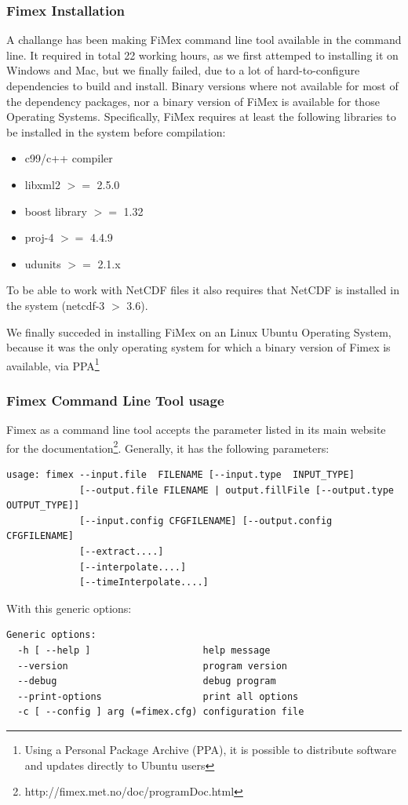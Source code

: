 \documentclass[11pt,a4paper,titlepage,oneside]{report}
\begin{document}
\subsubsection{\gls{Fimex} Installation}
\label{sec:ChallangeFimexInstallation}
A challange has been making FiMex command line tool available in the command line. It required in total 22 working hours, as we first attemped to installing it on Windows and Mac, but we finally failed, due to a lot of hard-to-configure dependencies to build and install. Binary versions where not available for most of the dependency packages, nor a binary version of FiMex is available for those Operating Systems.
Specifically, FiMex requires at least the following libraries to be installed in the system before compilation:
\begin{itemize}
\item c99/c++ compiler
\item libxml2 $>=$ 2.5.0
\item boost library $>=$ 1.32
\item proj-4 $>=$ 4.4.9
\item udunits $>=$ 2.1.x
\end{itemize}

To be able to work with NetCDF files it also requires that NetCDF is installed in the system (netcdf-3 $>$ 3.6).

We finally succeded in installing FiMex on an Linux Ubuntu Operating System, because it was the only operating system for which a binary version of \gls{Fimex} is available, via \gls{PPA}\footnote{Using a Personal Package Archive (\gls{PPA}), it is possible to distribute software and updates directly to Ubuntu users}

\subsubsection{\gls{Fimex} Command Line Tool usage}
\label{sec:ChallangeFimexCommandLine}
Fimex as a command line tool accepts the parameter listed in its main website for the documentation\footnote{http://fimex.met.no/doc/programDoc.html}.
Generally, it has the following parameters:
\begin{lstlisting}
usage: fimex --input.file  FILENAME [--input.type  INPUT_TYPE]
             [--output.file FILENAME | output.fillFile [--output.type OUTPUT_TYPE]]
             [--input.config CFGFILENAME] [--output.config CFGFILENAME]
             [--extract....]
             [--interpolate....]
             [--timeInterpolate....]
\end{lstlisting}
With this generic options:
\begin{lstlisting}
Generic options:
  -h [ --help ]                    help message
  --version                        program version
  --debug                          debug program
  --print-options                  print all options
  -c [ --config ] arg (=fimex.cfg) configuration file
\end{lstlisting}
\end{document}
